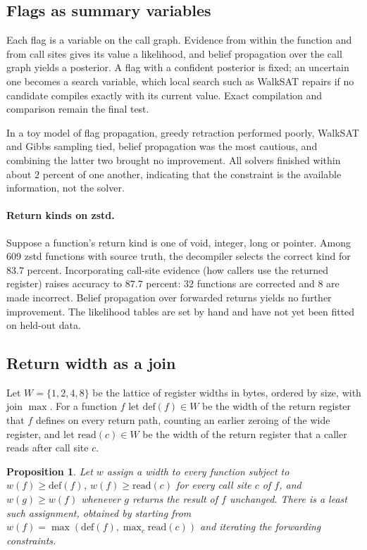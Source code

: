 \documentclass[11pt]{article}
\newtheorem{proposition}[theorem]{Proposition}
\theoremstyle{definition}
\theoremstyle{remark}
\begin{document}
\subsection{Flags as summary variables}

Each flag is a variable on the call graph. Evidence from within the function and from call sites gives its value a likelihood, and belief propagation over the call graph yields a posterior. A flag with a confident posterior is fixed; an uncertain one becomes a search variable, which local search such as WalkSAT repairs if no candidate compiles exactly with its current value. Exact compilation and comparison remain the final test.

In a toy model of flag propagation, greedy retraction performed poorly, WalkSAT and Gibbs sampling tied, belief propagation was the most cautious, and combining the latter two brought no improvement. All solvers finished within about $2$ percent of one another, indicating that the constraint is the available information, not the solver.

\paragraph{Return kinds on zstd.} Suppose a function's return kind is one of void, integer, long or pointer. Among 609 zstd functions with source truth, the decompiler selects the correct kind for $83.7$ percent. Incorporating call-site evidence (how callers use the returned register) raises accuracy to $87.7$ percent: 32 functions are corrected and 8 are made incorrect. Belief propagation over forwarded returns yields no further improvement. The likelihood tables are set by hand and have not yet been fitted on held-out data.

\subsection{Return width as a join}

Let $W = \{1, 2, 4, 8\}$ be the lattice of register widths in bytes, ordered by size, with join $\max$. For a function $f$ let $\mathrm{def}(f) \in W$ be the width of the return register that $f$ defines on every return path, counting an earlier zeroing of the wide register, and let $\mathrm{read}(c) \in W$ be the width of the return register that a caller reads after call site $c$.

\begin{proposition}
Let $w$ assign a width to every function subject to $w(f) \ge \mathrm{def}(f)$, $w(f) \ge \mathrm{read}(c)$ for every call site $c$ of $f$, and $w(g) \ge w(f)$ whenever $g$ returns the result of $f$ unchanged. There is a least such assignment, obtained by starting from $w(f) = \max(\mathrm{def}(f), \max_c \mathrm{read}(c))$ and iterating the forwarding constraints.
\end{proposition}
\end{document}
